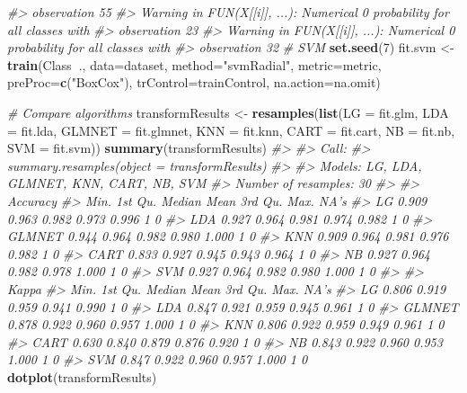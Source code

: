 \documentclass[]{book}
\newenvironment{Shaded}{\begin{snugshade}}{\end{snugshade}}
\newcommand{\CommentTok}[1]{\textcolor[rgb]{0.56,0.35,0.01}{\textit{#1}}}
\newcommand{\DataTypeTok}[1]{\textcolor[rgb]{0.13,0.29,0.53}{#1}}
\newcommand{\DecValTok}[1]{\textcolor[rgb]{0.00,0.00,0.81}{#1}}
\newcommand{\KeywordTok}[1]{\textcolor[rgb]{0.13,0.29,0.53}{\textbf{#1}}}
\newcommand{\NormalTok}[1]{#1}
\newcommand{\OperatorTok}[1]{\textcolor[rgb]{0.81,0.36,0.00}{\textbf{#1}}}
\newcommand{\StringTok}[1]{\textcolor[rgb]{0.31,0.60,0.02}{#1}}
\begin{document}
\begin{Shaded}
\begin{Highlighting}[]
\CommentTok{#> observation 55}
\CommentTok{#> Warning in FUN(X[[i]], ...): Numerical 0 probability for all classes with}
\CommentTok{#> observation 23}
\CommentTok{#> Warning in FUN(X[[i]], ...): Numerical 0 probability for all classes with}
\CommentTok{#> observation 32}
\CommentTok{# SVM}
\KeywordTok{set.seed}\NormalTok{(}\DecValTok{7}\NormalTok{)}
\NormalTok{fit.svm <-}\StringTok{ }\KeywordTok{train}\NormalTok{(Class}\OperatorTok{~}\NormalTok{., }\DataTypeTok{data=}\NormalTok{dataset, }\DataTypeTok{method=}\StringTok{"svmRadial"}\NormalTok{, }\DataTypeTok{metric=}\NormalTok{metric, }
                 \DataTypeTok{preProc=}\KeywordTok{c}\NormalTok{(}\StringTok{"BoxCox"}\NormalTok{), }\DataTypeTok{trControl=}\NormalTok{trainControl, }\DataTypeTok{na.action=}\NormalTok{na.omit)}

\CommentTok{# Compare algorithms}
\NormalTok{transformResults <-}\StringTok{ }\KeywordTok{resamples}\NormalTok{(}\KeywordTok{list}\NormalTok{(}\DataTypeTok{LG     =}\NormalTok{ fit.glm, }
                                  \DataTypeTok{LDA    =}\NormalTok{ fit.lda, }
                                  \DataTypeTok{GLMNET =}\NormalTok{ fit.glmnet, }
                                  \DataTypeTok{KNN    =}\NormalTok{ fit.knn, }
                                  \DataTypeTok{CART   =}\NormalTok{ fit.cart, }
                                  \DataTypeTok{NB     =}\NormalTok{ fit.nb, }
                                  \DataTypeTok{SVM    =}\NormalTok{ fit.svm))}
\KeywordTok{summary}\NormalTok{(transformResults)}
\CommentTok{#> }
\CommentTok{#> Call:}
\CommentTok{#> summary.resamples(object = transformResults)}
\CommentTok{#> }
\CommentTok{#> Models: LG, LDA, GLMNET, KNN, CART, NB, SVM }
\CommentTok{#> Number of resamples: 30 }
\CommentTok{#> }
\CommentTok{#> Accuracy }
\CommentTok{#>         Min. 1st Qu. Median  Mean 3rd Qu. Max. NA's}
\CommentTok{#> LG     0.909   0.963  0.982 0.973   0.996    1    0}
\CommentTok{#> LDA    0.927   0.964  0.981 0.974   0.982    1    0}
\CommentTok{#> GLMNET 0.944   0.964  0.982 0.980   1.000    1    0}
\CommentTok{#> KNN    0.909   0.964  0.981 0.976   0.982    1    0}
\CommentTok{#> CART   0.833   0.927  0.945 0.943   0.964    1    0}
\CommentTok{#> NB     0.927   0.964  0.982 0.978   1.000    1    0}
\CommentTok{#> SVM    0.927   0.964  0.982 0.980   1.000    1    0}
\CommentTok{#> }
\CommentTok{#> Kappa }
\CommentTok{#>         Min. 1st Qu. Median  Mean 3rd Qu. Max. NA's}
\CommentTok{#> LG     0.806   0.919  0.959 0.941   0.990    1    0}
\CommentTok{#> LDA    0.847   0.921  0.959 0.945   0.961    1    0}
\CommentTok{#> GLMNET 0.878   0.922  0.960 0.957   1.000    1    0}
\CommentTok{#> KNN    0.806   0.922  0.959 0.949   0.961    1    0}
\CommentTok{#> CART   0.630   0.840  0.879 0.876   0.920    1    0}
\CommentTok{#> NB     0.843   0.922  0.960 0.953   1.000    1    0}
\CommentTok{#> SVM    0.847   0.922  0.960 0.957   1.000    1    0}
\KeywordTok{dotplot}\NormalTok{(transformResults)}
\end{Highlighting}
\end{Shaded}
\end{document}
